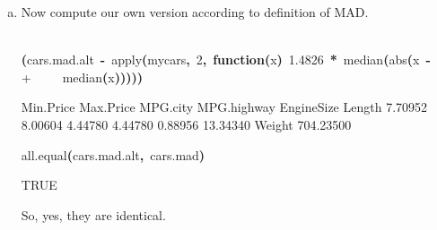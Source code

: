 \documentclass{article}
\newcommand{\hlnumber}[1]{\textcolor[rgb]{0.0823529411764706,0.0784313725490196,0.709803921568627}{#1}}%
\newcommand{\hlfunctioncall}[1]{\textcolor[rgb]{1,0,0}{#1}}%
\newcommand{\hlkeyword}[1]{\textcolor[rgb]{0,0,0}{\textbf{#1}}}%
\newcommand{\hlformalargs}[1]{\textcolor[rgb]{0.0705882352941176,0.713725490196078,0.0705882352941176}{#1}}%
\newcommand{\hlassignement}[1]{\textcolor[rgb]{0.215686274509804,0.215686274509804,0.384313725490196}{\textbf{#1}}}%
\newcommand{\hlsymbol}[1]{\textcolor[rgb]{0,0,0}{#1}}%
\newcommand{\hlprompt}[1]{\textcolor[rgb]{0,0,0}{#1}}%
\newcommand{\hlstd}[1]{\textcolor[rgb]{0,0,0}{#1}}%
\newenvironment{Houtput}{\raggedright}{%
%
}
\begin{document}
\begin{enumerate}[(a)]
\begin{Houtput}
\begin{Schunk}
\end{Schunk}
\end{Houtput}
        \item Now compute our own version according to definition of MAD.
\begin{Houtput}
\hspace*{\fill}\\
\hlstd{}\ttfamily\noindent
\hlprompt{\usebox{\hlnormalsizeboxgreaterthan}{\ }}\hlkeyword{(}\hlsymbol{cars.mad.alt}{\ }\hlassignement{\usebox{\hlnormalsizeboxlessthan}-}{\ }\hlfunctioncall{apply}\hlkeyword{(}\hlsymbol{mycars}\hlkeyword{,}{\ }\hlnumber{2}\hlkeyword{,}{\ }\hlkeyword{function}\hlkeyword{(}\hlformalargs{x}\hlkeyword{)}{\ }\hlnumber{1.4826}{\ }\hlkeyword{*}{\ }\hlfunctioncall{median}\hlkeyword{(}\hlfunctioncall{abs}\hlkeyword{(}\hlsymbol{x}{\ }\hlkeyword{-}\hspace*{\fill}\\
\hlstd{}\hlprompt{+{\ }}{\ }{\ }{\ }{\ }\hlfunctioncall{median}\hlkeyword{(}\hlsymbol{x}\hlkeyword{)}\hlkeyword{)}\hlkeyword{)}\hlkeyword{)}\hlkeyword{)}\mbox{}
\normalfont
\hspace*{\fill}\\
\hlstd{}\begin{Schunk}
\begin{Soutput}
  Min.Price   Max.Price    MPG.city MPG.highway  EngineSize      Length 
    7.70952     8.00604     4.44780     4.44780     0.88956    13.34340 
     Weight 
  704.23500 
\end{Soutput}
\ttfamily\noindent
\hlprompt{\usebox{\hlnormalsizeboxgreaterthan}{\ }}\hlfunctioncall{all.equal}\hlkeyword{(}\hlsymbol{cars.mad.alt}\hlkeyword{,}{\ }\hlsymbol{cars.mad}\hlkeyword{)}\mbox{}
\normalfont
\hspace*{\fill}\\
\hlstd{}\begin{Soutput}
[1] TRUE
\end{Soutput}

\end{Schunk}
\end{Houtput}
        So, yes, they are identical.
    \end{enumerate}
\end{document}
